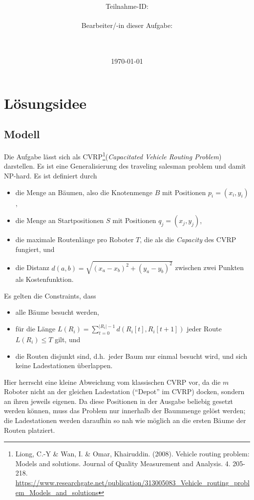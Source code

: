 \documentclass[a4paper,10pt,ngerman]{scrartcl}
\title{\textbf{\Huge\Aufgabe}}
\author{\LARGE Teilnahme-ID: \LARGE \TeilnahmeId \\\\
\LARGE Bearbeiter/-in dieser Aufgabe: \\
\LARGE \Name\\\\}
\date{\LARGE\today}
\begin{document}
    \maketitle
    \tableofcontents

    \vspace{0.5cm}

    \section{Lösungsidee}
    \subsection{Modell}
    Die Aufgabe lässt sich als CVRP\footnote{
        Liong, C.-Y \& Wan, I. \& Omar, Khairuddin. (2008). Vehicle routing problem: Models and solutions. Journal
        of Quality Measurement and Analysis. 4. 205-218.
        \url{https://www.researchgate.net/publication/313005083_Vehicle_routing_problem_Models_and_solutions}
    }(\textit{Capacitated Vehicle Routing Problem}) darstellen. Es ist eine Generalisierung des traveling salesman
    problem und damit NP-hard. Es ist definiert durch
    \begin{itemize}
        \item die Menge an Bäumen, also die Knotenmenge $B$ mit Positionen $p_i = (x_i, y_i)$,
        \item die Menge an Startpositionen $S$ mit Positionen $q_j = (x_j, y_j)$,
        \item die maximale Routenlänge pro Roboter $T$, die als die \textit{Capacity} des CVRP fungiert, und
        \item die Distanz $d(a, b) = \sqrt{(x_a-x_b)^2 + (y_a - y_b)^2}$ zwischen zwei Punkten als Kostenfunktion.
    \end{itemize}

    Es gelten die Constraints, dass
    \begin{itemize}
        \item alle Bäume besucht werden,
        \item für die Länge $L(R_i) = \sum_{t=0}^{|R_i| - 1} d(R_i[t], R_i[t + 1]) $ jeder Route $L(R_i) \leq T$ gilt,
        und
        \item die Routen disjunkt sind, d.h.\ jeder Baum nur einmal besucht wird, und sich keine Ladestationen
        überlappen.
    \end{itemize}

    Hier herrscht eine kleine Abweichung vom klassischen CVRP vor, da die $m$ Roboter nicht an der gleichen Ladestation
    (``Depot'' im CVRP) docken, sondern an ihren jeweils eigenen. Da diese Positionen in der Ausgabe beliebig gesetzt
    werden können, muss das Problem nur innerhalb der Baummenge gelöst werden; die Ladestationen werden daraufhin so nah
    wie möglich an die ersten Bäume der Routen platziert.
\end{document}
